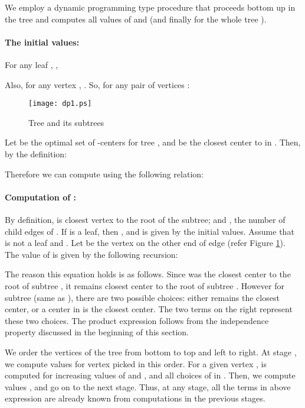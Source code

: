 \documentclass[11pt,onecolumn]{article}
\begin{document}
We employ a dynamic programming type procedure that proceeds bottom up in the tree and computes all values of  and  (and finally  for the whole tree ). 
\paragraph{The initial values:} For any leaf , ,

Also, for any vertex , . So, for any pair of vertices :


\begin{figure}[htbp]
\begin{center}
\texttt{[image: dp1.ps]}
\caption{Tree  and its subtrees}
\label{fig1}
\end{center}
\end{figure}

Let  be the optimal set of -centers for tree , and  be the closest center to  in . Then, by the definition: 

Therefore we can compute  using the following relation:


\paragraph{Computation of :}
By definition,  is closest vertex to the root  of the subtree; and , the number of child edges of . If  is a leaf, then , and  is given by the initial values. 
Assume that  is not a leaf and . Let  be the vertex on the other end of edge  (refer Figure \ref{fig1}). The value of  is given by the following recursion:



The reason this equation holds is as follows. 
Since  was the closest center to the root of subtree , it remains closest center to the root of subtree . However for subtree  (same as ), there are two possible choices: either  remains the closest center, or a center in  is the closest center.  
The two terms on the right represent these two choices. The product expression follows from the independence property discussed in the beginning of this section.
 
We order the vertices of the tree from bottom to top and left to right. 
At stage , we compute values  for  vertex  picked in this order. For a given vertex ,  is computed for increasing values of  and , and all choices of  in . Then, we compute values , and go on to the next stage.  
Thus, at any stage, all the terms in above expression are already known from computations in the previous stages. 
\end{document}
